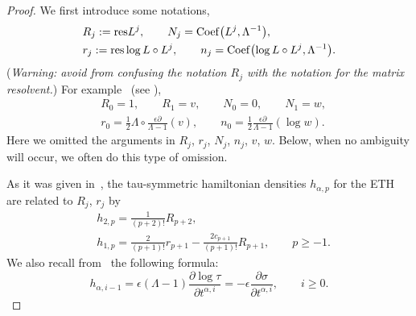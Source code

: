 \documentclass[pdftex]{sigma}
\newcommand{\e}{\epsilon}
\newcommand{\p}{\partial}
\newcommand{\nn}{\nonumber}
\numberwithin{equation}{section}
\begin{document}
\begin{proof}
We first introduce some notations,
\begin{align*}
& R_j := {\rm res} L^j, \qquad N_j={\rm Coef}\bigl(L^j, \Lambda^{-1}\bigr), \\
& r_j:= {\rm res} \log L \circ L^j, \qquad n_j= {\rm Coef}\bigl(\log L \circ L^j, \Lambda^{-1}\bigr).
\end{align*}
({\it Warning: avoid from confusing the notation $R_j$ with the notation for the matrix resolvent.})
For example~ (see \cite{Carlet}),
\begin{align*}
& R_0=1, \qquad R_1=v, \qquad N_0=0, \qquad N_1=w, \\
& r_0= \frac12 \Lambda \circ \frac{\e\p}{\Lambda-1} (v), \qquad n_0 = \frac12 \frac{\e\p}{\Lambda-1} (\log w) .
\end{align*}
Here we omitted the arguments in $R_j$, $r_j$, $N_j$, $n_j$, $v$, $w$. Below, when
no ambiguity will occur, we often do this type of omission.

As it was given in~\cite{CDZ}, the tau-symmetric hamiltonian densities $h_{\alpha, p}$ for the ETH
are related to $R_j$, $r_j$ by
\begin{align}
& h_{2, p} = \frac1{(p+2)!} R_{p+2}, \label{CDZtausymm2}\\
& h_{1,p} = \frac2{(p+1)!} r_{p+1} - \frac{2c_{p+1}}{(p+1)!} R_{p+1}, \qquad p\ge-1.\nn
\end{align}
We also recall from~\cite{CDZ} the following formula:
\[
h_{\alpha,i-1} = \e(\Lambda-1) \frac{\p \log \tau}{\p t^{\alpha,i}} = - \e\frac{\p \sigma}{\p t^{\alpha,i}}, \qquad i\ge0.
\]


\end{proof}
\end{document}
